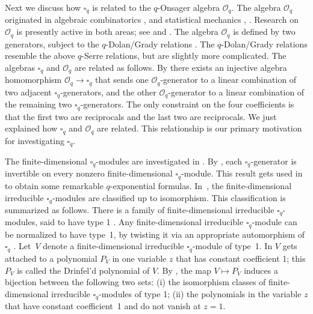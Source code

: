 \documentclass[pdftex]{sigma}
\numberwithin{equation}{section}
\begin{document}
Next we discuss how $\square_q$ is related to the
 $q$-Onsager algebra ${\mathcal O}_q$.
The algebra
 ${\mathcal O}_q$
originated in algebraic combinatorics
\cite[Lemma~5.4]{tersub3},
\cite{TwoRel}
and statistical mechanics \cite[Section~1]{bas1},
\cite[Section~2]{bas2}.
Research on ${\mathcal O}_q$ is presently active
in both areas; see
\cite{BK,
TD00,
qRacahIT,ITaug,
LS99,
madrid,
uaw,
pospart,
OnsagerLusztig,
Onsageruaw,
aw}
and
\cite{bas1,bas2,
bas6,basDef,
bas8,
basXXZ,
bas4,BK05,
bas7,
basnc,
bvu}.
The algebra ${\mathcal O}_q$ is defined by two generators, subject to the
$q$-Dolan/Grady relations
\cite[Definition~4.1]{pospart}. The
$q$-Dolan/Grady relations resemble the above $q$-Serre relations,
but are slightly more complicated.
The algebras $\square_q$ and ${\mathcal O}_q$ are related as follows.
By \cite[Proposition~5.6]{pospart} there exists an
injective algebra homomorphism
${\mathcal O}_q \to \square_q$ that sends
 one ${\mathcal O}_q$-generator
to a linear combination of two adjacent $\square_q$-generators,
and the other
 ${\mathcal O}_q$-generator
to a linear combination of the remaining two $\square_q$-generators.
The only constraint on the four coefficients is that the first two
are reciprocals and the last two are reciprocals.
We just explained how $\square_q$ and ${\mathcal O}_q$ are related.
This relationship is our primary motivation
for investigating $\square_q$.

The finite-dimensional $\square_q$-modules
are investigated in \cite{yy2, yy1}. By \cite[Proposition~5.2]{yy1},
each $\square_q$-generator is invertible
on every nonzero finite-dimensional $\square_q$-module. This result gets used in \cite[Sections~8 and~9]{yy1} to obtain some remarkable $q$-exponential formulas.
In~\cite{yy2}, the finite-dimensional irreducible $\square_q$-modules
are classified up to isomorphism.
This classification is summarized as follows.
There is a family of
finite-dimensional irreducible $\square_q$-modules,
said to have type 1
\cite[Definition~6.8]{yy2}.
Any finite-dimensional irreducible $\square_q$-module can be normalized
to have type~1, by twisting it via an appropriate automorphism of $\square_q$
\cite[Note~6.9]{yy2}.
Let~$V$ denote a
finite-dimensional irreducible $\square_q$-module of type~1.
In \cite[Definition~8.6]{yy2} $V$
gets attached to a polynomial $P_V$ in one variable $z$
that has constant coefficient 1; this
$P_V$ is called the Drinfel'd polynomial of $V$.
By \cite[Proposition~1.4]{yy2}, the map
$V\mapsto P_V$
induces a bijection between the following two sets:
(i) the isomorphism classes of finite-dimensional irreducible
$\square_q$-modules of type 1;
 (ii) the polynomials in the variable $z$ that have constant
coefficient~1 and do not vanish at $z=1$.
\end{document}

